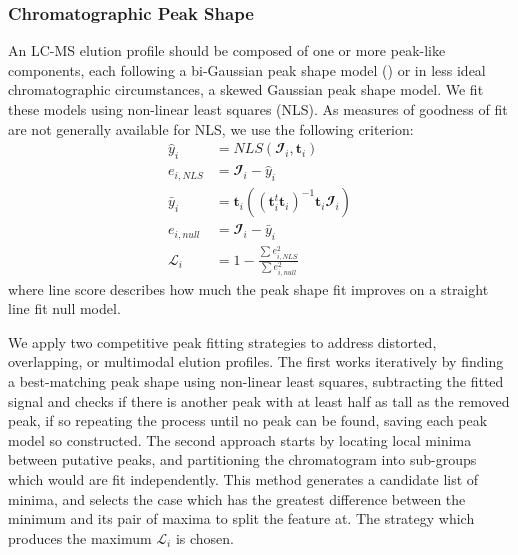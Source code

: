     \subsubsection{Chromatographic Peak Shape}
        An LC-MS elution profile should be composed of one or more peak-like components, each
        following a bi-Gaussian peak shape model (\cite{Yu2010}) or in less ideal chromatographic
        circumstances, a skewed Gaussian peak shape model. We fit these models using non-linear
        least squares (NLS). As measures of goodness of fit are not generally available for NLS,
        we use the following criterion:
        \begin{align}
            {\hat y_i} &= NLS(\mathbfcal{I}_i, \mathbf{t}_i) \nonumber\\
            e_{i, NLS} &= \mathbfcal{I}_i - {\hat y_i} \nonumber\\
            {\bar y_i} &= \mathbf{t}_i
                \left(
                    \left(
                        \mathbf{t}_i^t\mathbf{t}_i
                    \right)^{-1}\mathbf{t}_i\mathbfcal{I}_i
                \right)\nonumber\\
            e_{i, null} &= \mathbfcal{I}_i - {\bar y_i} \nonumber\\
            \mathscr{L}_i &= 1 - \frac{\sum{e_{i, NLS}^2}}{\sum{e_{i, null}^2}}
        \end{align}
        \noindent where line score describes how much the peak shape fit improves on a straight
        line fit null model.

        We apply two competitive peak fitting strategies to address distorted, overlapping, or
        multimodal elution profiles. The first works iteratively by finding a best-matching peak
        shape using non-linear least squares, subtracting the fitted signal and checks if there is
        another peak with at least half as tall as the removed peak, if so repeating the process until
        no peak can be found, saving each peak model so constructed. The second approach starts
        by locating local minima between putative peaks, and partitioning the chromatogram into
        sub-groups which would are fit independently. This method generates a candidate list of
        minima, and selects the case which has the greatest difference between the minimum and its
        pair of maxima to split the feature at. The strategy which produces the maximum $\mathscr{L}_i$
        is chosen.

